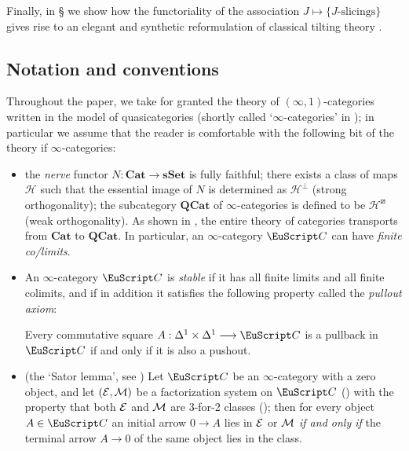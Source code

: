 Finally, in § we show how the functoriality of the association $J\mapsto \{\text{$J$-slicings}\}$ gives rise to an elegant and synthetic reformulation of classical tilting theory \cite{happel}.
{\color{green!40!black}
\subsection{Notation and conventions}
Throughout the paper, we take for granted the theory of $(\infty,1)$-categories written in the model of quasicategories (shortly called `$\infty$-categories' in \cite{HTT}); in particular we assume that the reader is comfortable with the following bit of the theory if $\infty $-categories:
\begin{itemize}
 \item the \emph{nerve} functor $N : \mathbf{Cat} \to \mathbf{sSet}$ is fully faithful; there exists a class of maps $\mathcal H$ such that the essential image of $N$ is determined as $\mathcal H^\perp$ (strong orthogonality); the subcategory $\mathbf{QCat}$ of $\infty$-categories is defined to be $\mathcal H^\boxslash$ (weak orthogonality). As shown in \cite{HTT, Joyal2008}, the entire theory of categories transports from $\mathbf{Cat}$ to $\mathbf{QCat}$. In particular, an $\infty$-category $\C$ can have \emph{finite co/limits}.
 \item An $\infty$-category $\C$ is \emph{stable} if it has all finite limits and all finite colimits, and if in addition it satisfies the following property called the \emph{pullout axiom}:
 \begin{center}
  \begin{minipage}{.75\textwidth}
Every commutative square $A : \Delta^1\times\Delta^1\to \C$ is a pullback in $\C$ if and only if it is also a pushout.
  \end{minipage}
 \end{center}
 \item (the `Sator lemma', see \cite[Lemma 3]{FL0}) Let $\C$ be an $\infty$-category with a zero object, and let $(\mathcal{E},\mathcal{M})$ be a factorization system on $\C$ (\cite[Definition 8]{FL0}) with the property that both $\mathcal{E}$ and $\mathcal{M}$ are 3-for-2 classes (\cite[Definition 10]{FL0}); then for every object $A\in\C$ an initial arrow $0\to A$ lies in $\mathcal{E}$ or $\mathcal{M}$ \emph{if and only if} the terminal arrow $A\to 0$ of the same object lies in the class.
\end{itemize}
}
